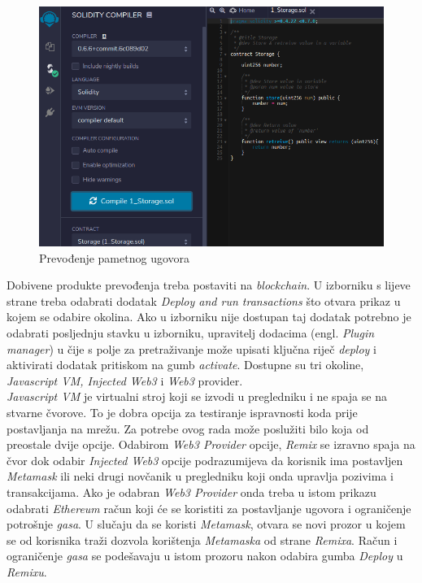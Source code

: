 \documentclass[times, utf8, zavrsni, numeric]{fer}
\begin{document}
\begin{figure}[ht]
  \includegraphics[width=\textwidth]{remixcompiled.png}
  \caption{Prevođenje pametnog ugovora}
  \centering
  \vfill
\end{figure}

\pagebreak

Dobivene produkte prevođenja treba postaviti na \emph{blockchain}. U izborniku s lijeve strane treba odabrati dodatak \emph{Deploy and run transactions} što otvara
prikaz u kojem se odabire okolina. Ako u izborniku nije dostupan taj dodatak potrebno je odabrati posljednju stavku u izborniku, upravitelj dodacima (engl. \emph{Plugin manager})
u čije s polje za pretraživanje može upisati ključna riječ \emph{deploy} i aktivirati dodatak pritiskom na gumb \emph{activate}.
Dostupne su tri okoline, \emph{Javascript VM, Injected Web3} i \emph{Web3} provider. \\
\emph{Javascript VM} je virtualni stroj koji se izvodi u pregledniku i ne spaja se na stvarne čvorove. To je dobra opcija za testiranje ispravnosti koda prije postavljanja
na mrežu. Za potrebe ovog rada može poslužiti bilo koja od preostale dvije opcije. Odabirom \emph{Web3 Provider} opcije, \emph{Remix} se izravno spaja na čvor dok odabir
\emph{Injected Web3} opcije podrazumijeva da korisnik ima postavljen \emph{Metamask} ili neki drugi novčanik u pregledniku koji onda upravlja pozivima i transakcijama.
Ako je odabran \emph{Web3 Provider} onda treba u istom prikazu odabrati \emph{Ethereum} račun koji će se koristiti za postavljanje ugovora i ograničenje potrošnje
\emph{gasa}. U slučaju da se koristi \emph{Metamask}, otvara se novi prozor u kojem se od korisnika traži dozvola korištenja \emph{Metamaska} od strane \emph{Remixa}.
Račun i ograničenje \emph{gasa} se podešavaju u istom prozoru nakon odabira gumba \emph{Deploy} u \emph{Remixu}. 
\end{document}
